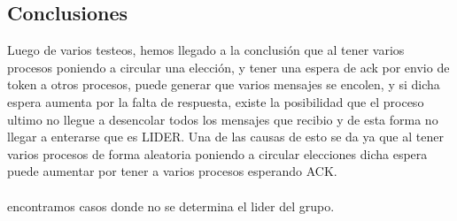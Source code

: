 
\subsection{Conclusiones}

Luego de varios testeos, hemos llegado a la conclusión que al tener varios procesos poniendo a circular una elección, y tener una espera de ack por envio de token a otros procesos, puede generar que varios mensajes se encolen, y si dicha espera aumenta por la falta de respuesta, existe la posibilidad que el proceso ultimo no llegue a desencolar todos los mensajes que recibio y de esta forma no llegar a enterarse que es LIDER. Una de las causas de esto se da ya que al  tener varios procesos de forma aleatoria poniendo a circular elecciones dicha espera puede aumentar por tener a varios procesos esperando ACK.\\\\

encontramos casos donde no se determina el lider del grupo.


